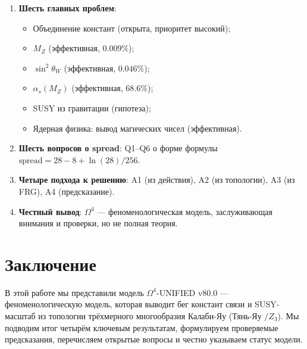 \documentclass[11pt,a4paper]{article}
\newcommand{\Om}{\ensuremath{\Omega^4}}
\theoremstyle{definition}
\begin{document}
\begin{enumerate}
    \item \textbf{Шесть главных проблем}:
          \begin{itemize}
              \item Объединение констант (открыта, приоритет высокий);
              \item $M_Z$ (эффективная, $0.009\%$);
              \item $\sin^2\theta_W$ (эффективная, $0.046\%$);
              \item $\alpha_s(M_Z)$ (эффективная, $68.6\%$);
              \item SUSY из гравитации (гипотеза);
              \item Ядерная физика: вывод магических чисел (эффективная).
          \end{itemize}
    \item \textbf{Шесть вопросов о spread}: Q1--Q6 о форме
          формулы $\text{spread} = 28 - 8 + \ln(28)/256$.
    \item \textbf{Четыре подхода к решению}: A1 (из действия),
          A2 (из топологии), A3 (из FRG), A4 (предсказание).
    \item \textbf{Честный вывод}: $\Om$ --- феноменологическая
          модель, заслуживающая внимания и проверки, но
          не полная теория.
\end{enumerate}

\section{Заключение}
\label{sec:conclusions}

В этой работе мы представили модель $\Om$-UNIFIED v80.0 ---
феноменологическую модель, которая выводит бег констант связи
и SUSY-масштаб из топологии трёхмерного многообразия
Калаби-Яу (Тянь-Яу $/Z_3$). Мы подводим итог четырём ключевым
результатам, формулируем проверяемые предсказания, перечисляем
открытые вопросы и честно указываем статус модели.

\end{document}
